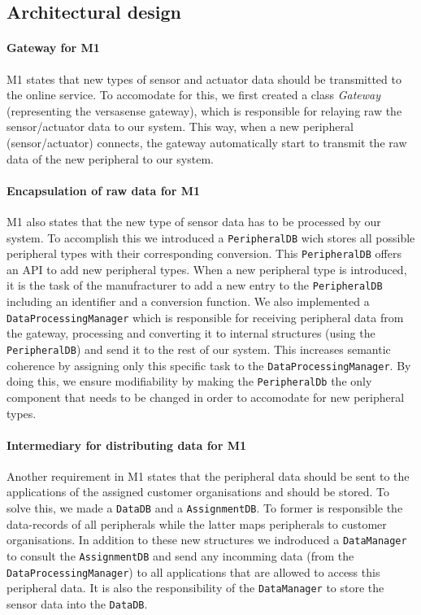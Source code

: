 \documentclass[english]{sareport}
\begin{document}
\subsection{Architectural design}
\paragraph{Gateway for M1}
M1 states that new types of sensor and actuator data should be transmitted to the online service. To accomodate for this, we first created a class \textit{Gateway} (representing the versasense gateway), which is responsible for relaying raw the sensor/actuator data to our system. This way, when a new peripheral (sensor/actuator) connects, the gateway automatically start to transmit the raw data of the new peripheral to our system.
\paragraph{Encapsulation of raw data for M1}
M1 also states that the new type of sensor data has to be processed by our system. To accomplish this we introduced a \texttt{PeripheralDB} wich stores all possible peripheral types with their corresponding conversion. This \texttt{PeripheralDB} offers an API to add new peripheral types. When a new peripheral type is introduced, it is the task of the manufracturer to add a new entry to the \texttt{PeripheralDB} including an identifier and a conversion function. We also implemented a \texttt{DataProcessingManager} which is responsible for receiving peripheral data from the gateway, processing and converting it to internal structures (using the \texttt{PeripheralDB}) and send it to the rest of our system. This increases semantic coherence by assigning only this specific task to the \texttt{DataProcessingManager}. By doing this, we ensure modifiability by making the \texttt{PeripheralDb} the only component that needs to be changed in order to accomodate for new peripheral types.
\paragraph{Intermediary for distributing data for M1}
Another requirement in M1 states that the peripheral data should be sent to the applications of the assigned customer organisations and should be stored. To solve this, we made a \texttt{DataDB} and a \texttt{AssignmentDB}. To former is responsible the data-records of all peripherals while the latter maps peripherals to customer organisations. In addition to these new structures we indroduced a \texttt{DataManager} to consult the \texttt{AssignmentDB} and send any incomming data (from the \texttt{DataProcessingManager}) to all applications that are allowed to access this peripheral data. It is also the responsibility of the \texttt{DataManager} to store the sensor data into the \texttt{DataDB}.
\end{document}
